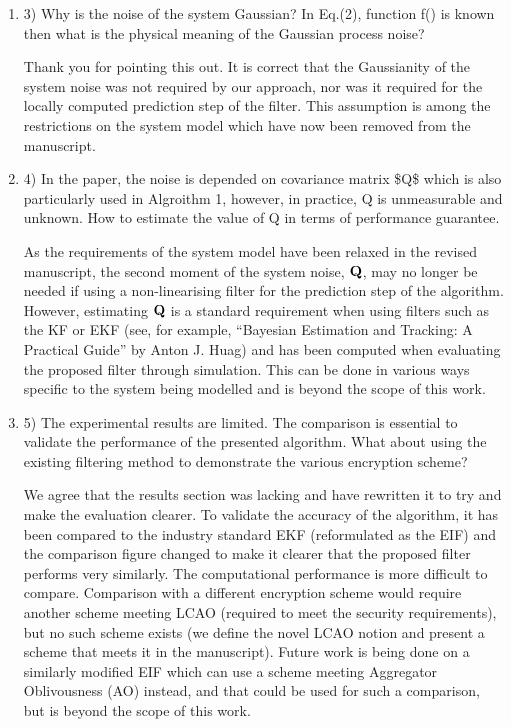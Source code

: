 \documentclass[a4paper]{scrartcl}
\newenvironment{rebuttal}{\begin{enumerate}[label={\color{grey}\thesection.\arabic{enumi}},leftmargin=0pt,ref=\thesection.\arabic{enumi}]}{\end{enumerate}}
\newcommand{\reviewtext}[1]{{\color{nblue} #1}}
\begin{document}
\begin{rebuttal}
\item \reviewtext{3) Why is the noise of the system Gaussian? In Eq.(2), function f() is known then what is the physical meaning of the Gaussian process noise?}

Thank you for pointing this out. It is correct that the Gaussianity of the system noise was not required by our approach, nor was it required for the locally computed prediction step of the filter. This assumption is among the restrictions on the system model which have now been removed from the manuscript.

\item \reviewtext{4) In the paper, the noise is depended on covariance matrix \$Q\$ which is also particularly used in Algroithm 1, however, in practice, Q is unmeasurable and unknown. How to estimate the value of Q in terms of performance guarantee.}

As the requirements of the system model have been relaxed in the revised manuscript, the second moment of the system noise, ${{\mathbf{Q}}}$, may no longer be needed if using a non-linearising filter for the prediction step of the algorithm. However, estimating ${{\mathbf{Q}}}$ is a standard requirement when using filters such as the KF or EKF (see, for example, ``Bayesian Estimation and Tracking: A Practical Guide'' by Anton J. Huag) and has been computed when evaluating the proposed filter through simulation. This can be done in various ways specific to the system being modelled and is beyond the scope of this work.

\item \reviewtext{5) The experimental results are limited. The comparison is essential to validate the performance of the presented algorithm. What about using the existing filtering method to demonstrate the various encryption scheme?}

We agree that the results section was lacking and have rewritten it to try and make the evaluation clearer. To validate the accuracy of the algorithm, it has been compared to the industry standard EKF (reformulated as the EIF) and the comparison figure changed to make it clearer that the proposed filter performs very similarly. The computational performance is more difficult to compare. Comparison with a different encryption scheme would require another scheme meeting LCAO (required to meet the security requirements), but no such scheme exists (we define the novel LCAO notion and present a scheme that meets it in the manuscript). Future work is being done on a similarly modified EIF which can use a scheme meeting Aggregator Oblivousness (AO) instead, and that could be used for such a comparison, but is beyond the scope of this work.


\end{rebuttal}
\end{document}
